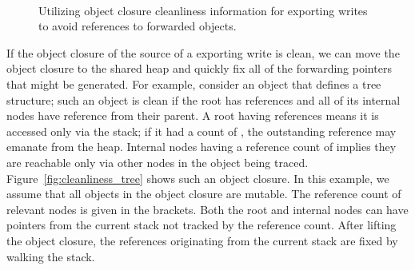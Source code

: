 \begin{figure}
\centering
{}\\
\caption{Utilizing object closure cleanliness information for exporting writes to avoid references to forwarded objects.}
\label{fig:cleanliness_examples}
\end{figure}

If the object closure of the source of a exporting write is clean, we can move
the object closure to the shared heap and quickly fix all of the forwarding
pointers that might be generated. For example, consider an object that defines
a tree structure; such an object is clean if the root has  references
and all of its internal nodes have  reference from their parent.  A
root having  references means it is accessed only via the stack; if it
had a count of , the outstanding reference may emanate from the heap.
Internal nodes having a reference count of  implies they are reachable
only via other nodes in the object being traced.
Figure~\ref{fig:cleanliness_tree} shows such an object closure. In this
example, we assume that all objects in the object closure are mutable. The
reference count of relevant nodes is given in the brackets.  Both the root and
internal nodes can have pointers from the current stack not tracked by the
reference count. After lifting the object closure, the references originating
from the current stack are fixed by walking the stack.

